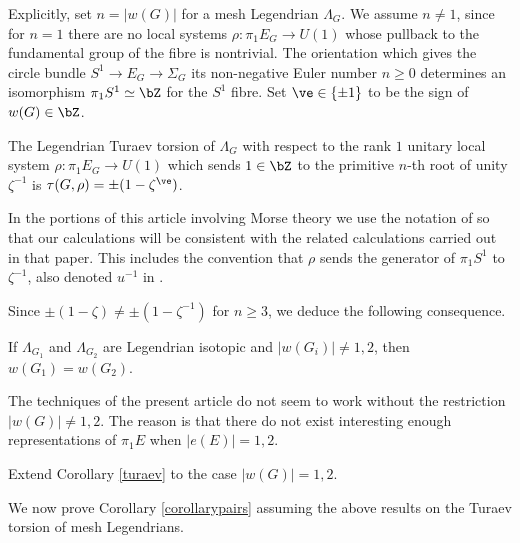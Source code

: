 Explicitly, set $n=|w(G)|$ for a mesh Legendrian $\Lambda_G$. We assume $n \neq 1$, since for $n=1$ there are no local systems $\rho: \pi_1 E_G \to U(1)$ whose pullback to the fundamental group of the fibre is nontrivial. The orientation which gives the circle bundle $S^1 \to E_G \to \Sigma_G$ its non-negative Euler number $n \geq 0$ determines an isomorphism $\pi_1S^1 \simeq \bZ$ for the $S^1$ fibre. Set $\ve \in \{ \pm 1 \}$ to be the sign of $w(G) \in \bZ$.

\begin{theorem}\label{calculation} The Legendrian Turaev torsion of $\Lambda_G$ with respect to the rank $1$ unitary local system $\rho:\pi_1E_G \to U(1)$ which sends $1 \in \bZ$ to the primitive $n$-th root of unity $\zeta^{-1}$ is $\tau(G, \rho)=\pm(1-\zeta^\ve)$.
\end{theorem}

\begin{remark}\label{rem: notation of IK}
In the portions of this article involving Morse theory we use the notation of \cite{IK93} so that our calculations will be consistent with the related calculations carried out in that paper. This includes the convention that $\rho$ sends the generator of $\pi_1S^1$ to $\zeta^{-1}$, also denoted $u^{-1}$ in \cite{IK93}.
\end{remark}

Since $\pm(1-\zeta) \neq \pm(1-\zeta^{-1})$ for $n \geq 3$, we deduce the following consequence.

\begin{corollary}\label{turaev}
If $\Lambda_{G_1}$ and $\Lambda_{G_2}$ are Legendrian isotopic and $|w(G_i)| \neq 1,2$, then $w(G_1)=w(G_2)$.
\end{corollary}

The techniques of the present article do not seem to work without the restriction $|w(G)|\neq 1,2$. The reason is that there do not exist interesting enough representations of $\pi_1E$ when $|e(E)| = 1,2$.

\begin{problem}
Extend Corollary \ref{turaev} to the case $|w(G)|=1,2$.
\end{problem}

We now prove Corollary \ref{corollarypairs} assuming the above results on the Turaev torsion of mesh Legendrians.

